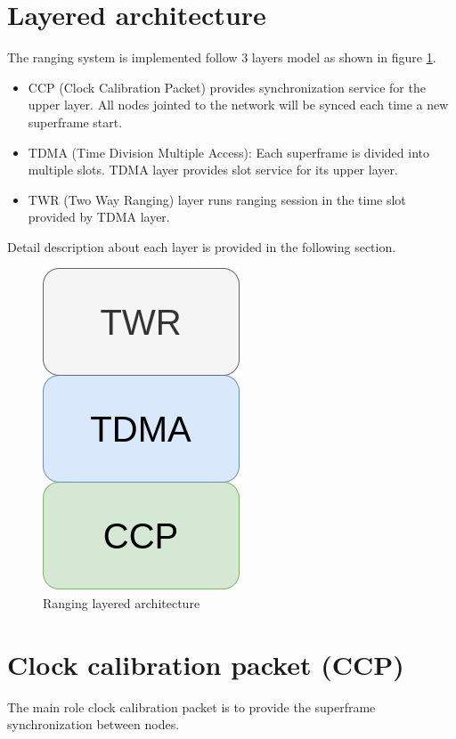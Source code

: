 \documentclass[\main/main.tex]{subfiles}
\begin{document}
\section{Layered architecture}
The ranging system is implemented follow 3 layers model as shown in figure \ref{fig:ranging_layered_architecture}. 
\begin{itemize}
    \item CCP (Clock Calibration Packet) provides synchronization service for the upper layer. All nodes jointed to the network will be synced each time a new superframe start.
    \item TDMA (Time Division Multiple Access): Each superframe is divided into multiple slots. TDMA layer provides slot service for its upper layer. 
    \item TWR (Two Way Ranging) layer runs ranging session in the time slot provided by TDMA layer.
\end{itemize}

Detail description about each layer is provided in the following section.
\begin{figure}[H]
    \begin{center}
        \includegraphics[scale=0.3]{ranging_layered_architecture}
    \end{center}
    \caption{Ranging layered architecture}
    \label{fig:ranging_layered_architecture}
\end{figure}

\section{Clock calibration packet (CCP)}
The main role clock calibration packet is to provide the superframe synchronization between nodes. 
\end{document}
